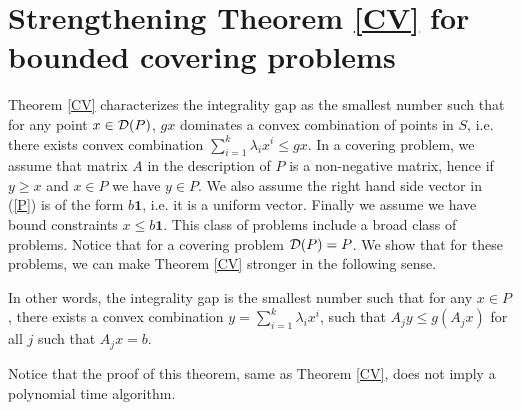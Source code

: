 \section{Strengthening Theorem \ref{CV} for bounded covering problems} \label{gap}

Theorem \ref{CV} characterizes the integrality gap as the smallest number such that for any point $x\in \operatorname{\mathcal{D}}(P)$, $gx$ dominates a convex combination of points in $S$, i.e. there exists convex combination $\sum_{i=1}^{k}\lambda_ix^i \leq gx$.  In a covering problem, we assume that matrix $A$ in the description of $P$ is a non-negative matrix, hence if $y\geq x$ and $x\in P$ we have $y\in P$. We also assume the right hand side vector in (\ref{P}) is of the form $b\textbf{1}$, i.e. it is a uniform vector. Finally we assume we have bound constraints $x\leq b\textbf{1}$. This class of problems include a broad class of problems. Notice that for a covering problem $\operatorname{\mathcal{D}}(P)=P$.  We show that for these problems, we can make Theorem \ref{CV} stronger in the following sense. 

\tightcuts*

In other words, the integrality gap is the smallest number such that for any $x\in P$, there exists a convex combination $y=\sum_{i=1}^{k}\lambda_ix^i$, such that $A_jy\leq g(A_jx)$ for all $j$ such that $A_jx=b$. 

Notice that the proof of this theorem, same as Theorem \ref{CV}, does not imply a polynomial time algorithm.

